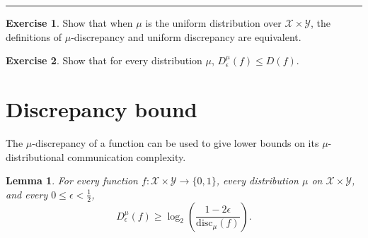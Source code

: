 \documentclass[11pt,oneside]{book}
\theoremstyle{plain}
\newtheorem{lemma}{Lemma}
\theoremstyle{definition}
\newtheorem{exercise}{Exercise}
\theoremstyle{plain}
\newcommand{\calX}{\mathcal{X}}
\newcommand{\calY}{\mathcal{Y}}
\newcommand{\disc}{\mathrm{disc}}
\newcommand{\exercises}{\bigskip \noindent\rule{8cm}{0.4pt} \medskip}
\begin{document}
\exercises

\begin{exercise}
	Show that when $\mu$ is the uniform distribution over $\calX \times \calY$, the definitions of $\mu$-discrepancy and uniform discrepancy are equivalent.
\end{exercise}

\begin{exercise}
	Show that for every distribution $\mu$, $D^\mu_\epsilon(f) \le D(f)$.
\end{exercise}


 \section{Discrepancy bound}

The $\mu$-discrepancy of a function can be used to give lower bounds on its $\mu$-distributional communication complexity.

\begin{lemma}
	For every function $f : \calX \times \calY \to \{0,1\}$, every distribution $\mu$ on $\calX \times \calY$, and every $0 \le \epsilon < \frac12$,
	\[
	D_\epsilon^{\mu}(f) \ge \log_2 \left( \frac{1-2\epsilon}{\disc_\mu(f)} \right).
	\]
\end{lemma}
\end{document}
